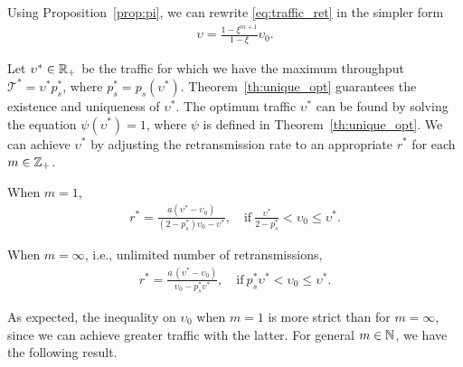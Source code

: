 Using Proposition~\ref{prop:pi}, we can rewrite \eqref{eq:traffic_ret} in the simpler form
\begin{align} \label{eq:traffic_ret2}
    \upsilon = \frac{1-\xi^{m+1}}{1-\xi} \upsilon_0.
\end{align}

Let $\upsilon^*\in{\mathbb R}_+$ be the traffic for which we have the maximum throughput $\mathscr{T}^* = \upsilon^* p_s^*$, where $p_s^* = p_s(\upsilon^*)$. Theorem~\ref{th:unique_opt} guarantees the existence and uniqueness of $\upsilon^*$.
%
The optimum traffic $\upsilon^*$ can be found by solving the equation $\psi(\upsilon^*) = 1$, where $\psi$ is defined in Theorem~\ref{th:unique_opt}.
%
We can achieve $\upsilon^*$ by adjusting the retransmission rate to an appropriate $r^*$ for each $m\in{\mathbb Z}_+$.

When $m=1$,\vspace{-5mm}
\begin{align}
    r^* = \frac{a(\upsilon^*-\upsilon_0)}{(2-p_s^*)\upsilon_0 - \upsilon^*}, \quad\text{if}~ \frac{\upsilon^*}{2-p_s^*} < \upsilon_0 \le \upsilon^*.
\end{align}

When $m = \infty$, i.e., unlimited number of retransmissions,
\begin{align} \label{eq:opt_retr_rate}
    r^* = \frac{a\,(\upsilon^*-\upsilon_0)}{\upsilon_0 - p_s^* \upsilon^*}, \quad\text{if}~ p_s^* \upsilon^* < \upsilon_0 \le \upsilon^*.
\end{align}

As expected, the inequality on $\upsilon_0$ when $m=1$ is more strict than for $m = \infty$, since we can achieve greater traffic with the latter.
%
For general $m\in{\mathbb N}$, we have the following result.

